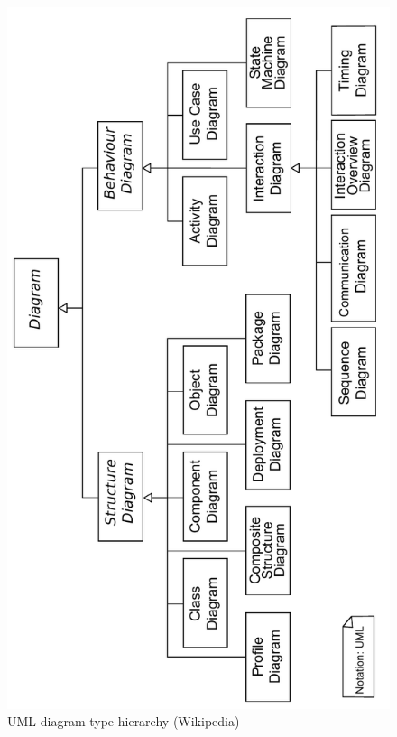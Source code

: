 \documentclass{llncs}
\begin{document}
\begin{figure}[h!t]
 \centering
 \includegraphics[scale=0.54,angle=270]{images/uml}
 \caption{UML diagram type hierarchy (Wikipedia)}
 \label{fig:uml}
\end{figure}
\end{document}
